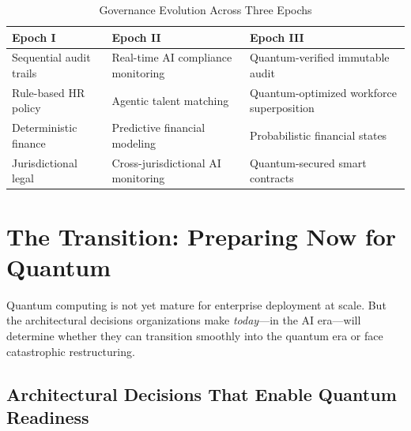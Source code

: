 \documentclass[11pt,a4paper,twocolumn]{article}
\begin{document}
\begin{table}[H]
\centering
\small
\begin{tabular}{@{} >{\raggedright\arraybackslash}p{1.9cm} >{\raggedright\arraybackslash}p{2.3cm} >{\raggedright\arraybackslash}p{3.0cm} @{}}
\toprule
\textbf{Epoch I} & \textbf{Epoch II} & \textbf{Epoch III} \\
\midrule
Sequential audit trails & Real-time AI compliance monitoring & Quantum-verified immutable audit \\[6pt]
Rule-based HR policy & Agentic talent matching & Quantum-optimized workforce superposition \\[6pt]
\hspace{0pt}Deterministic finance & Predictive financial modeling & Probabilistic financial states \\[6pt]
\hspace{0pt}Jurisdictional legal & \hspace{0pt}Cross-jurisdictional AI monitoring & Quantum-secured smart contracts \\
\bottomrule
\end{tabular}
\caption{Governance Evolution Across Three Epochs}
\label{tab:governance-evolution}
\end{table}


\section{The Transition: Preparing Now for Quantum}
\label{sec:transition}

Quantum computing is not yet mature for enterprise deployment at scale. But the architectural decisions organizations make \textit{today}---in the AI era---will determine whether they can transition smoothly into the quantum era or face catastrophic restructuring.

\subsection{Architectural Decisions That Enable Quantum Readiness}
\end{document}
